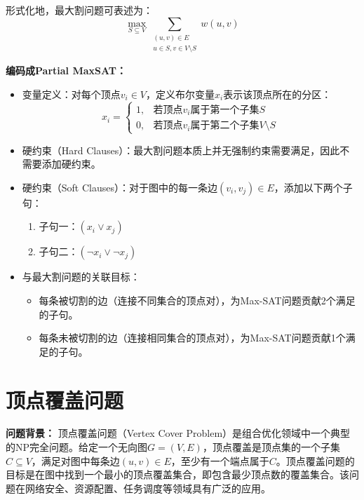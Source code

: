 \documentclass{article}
\begin{document}
形式化地，最大割问题可表述为：
\[
\max_{S\subseteq V} \sum_{\substack{(u,v)\in E \\ u\in S, v\in V\setminus S}} w(u,v)
\]

\textbf{编码成Partial MaxSAT：}

\begin{itemize}
    \item 变量定义：对每个顶点$v_i\in V$，定义布尔变量$x_i$表示该顶点所在的分区：
    \[
    x_i=
    \begin{cases}
        1,& \text{若顶点$v_i$属于第一个子集$S$}\\[4pt]
        0,& \text{若顶点$v_i$属于第二个子集$V\setminus S$}
    \end{cases}
    \]

    \item 硬约束（Hard Clauses）：最大割问题本质上并无强制约束需要满足，因此不需要添加硬约束。

    \item 硬约束（Soft Clauses）：对于图中的每一条边$(v_i,v_j)\in E$，添加以下两个子句：

    \begin{enumerate}
        \item 子句一：$(x_i \vee x_j)$
        \item 子句二：$(\neg x_i \vee \neg x_j)$
    \end{enumerate}
    
    \item 与最大割问题的关联目标：
    \begin{itemize}
        \item 每条被切割的边（连接不同集合的顶点对），为Max-SAT问题贡献2个满足的子句。
        \item 每条未被切割的边（连接相同集合的顶点对），为Max-SAT问题贡献1个满足的子句。
    \end{itemize}

    \end{itemize}


\newpage
\section*{顶点覆盖问题}
\textbf{问题背景：}
顶点覆盖问题（Vertex Cover Problem）是组合优化领域中一个典型的NP完全问题。给定一个无向图$G=(V,E)$，顶点覆盖是顶点集的一个子集$C \subseteq V$，满足对图中每条边$(u,v) \in E$，至少有一个端点属于$C$。顶点覆盖问题的目标是在图中找到一个最小的顶点覆盖集合，即包含最少顶点数的覆盖集合。该问题在网络安全、资源配置、任务调度等领域具有广泛的应用。
\end{document}
